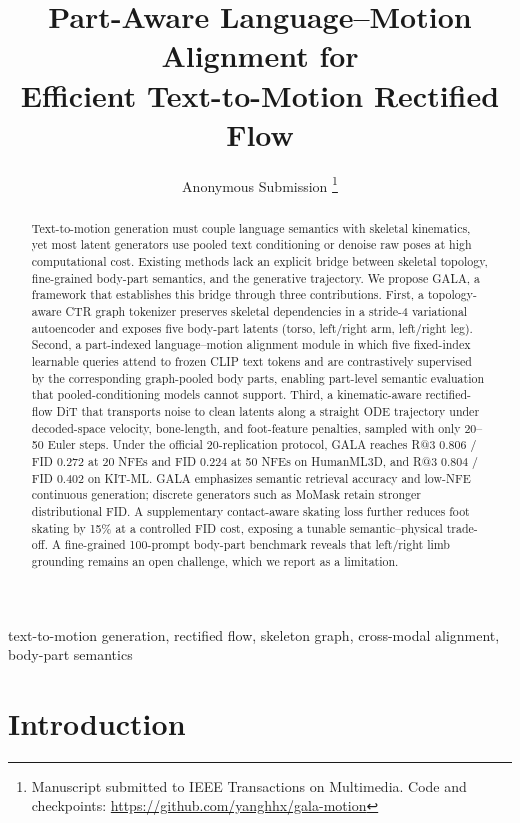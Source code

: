 \documentclass[journal]{IEEEtran}
\title{Part-Aware Language--Motion Alignment for\\Efficient Text-to-Motion Rectified Flow}
\author{Anonymous Submission%
\thanks{Manuscript submitted to IEEE Transactions on Multimedia. Code and checkpoints: \url{https://github.com/yanghhx/gala-motion}}}
\begin{document}
\maketitle

\begin{abstract}
Text-to-motion generation must couple language semantics with skeletal kinematics, yet most latent generators use pooled text conditioning or denoise raw poses at high computational cost. Existing methods lack an explicit bridge between skeletal topology, fine-grained body-part semantics, and the generative trajectory. We propose GALA, a framework that establishes this bridge through three contributions. First, a topology-aware CTR graph tokenizer preserves skeletal dependencies in a stride-4 variational autoencoder and exposes five body-part latents (torso, left/right arm, left/right leg). Second, a part-indexed language--motion alignment module in which five fixed-index learnable queries attend to frozen CLIP text tokens and are contrastively supervised by the corresponding graph-pooled body parts, enabling part-level semantic evaluation that pooled-conditioning models cannot support. Third, a kinematic-aware rectified-flow DiT that transports noise to clean latents along a straight ODE trajectory under decoded-space velocity, bone-length, and foot-feature penalties, sampled with only 20--50 Euler steps. Under the official 20-replication protocol, GALA reaches R@3 $0.806$ / FID $0.272$ at 20 NFEs and FID $0.224$ at 50 NFEs on HumanML3D, and R@3 $0.804$ / FID $0.402$ on KIT-ML. GALA emphasizes semantic retrieval accuracy and low-NFE continuous generation; discrete generators such as MoMask retain stronger distributional FID. A supplementary contact-aware skating loss further reduces foot skating by 15\% at a controlled FID cost, exposing a tunable semantic--physical trade-off. A fine-grained 100-prompt body-part benchmark reveals that left/right limb grounding remains an open challenge, which we report as a limitation.
\end{abstract}

\begin{IEEEkeywords}
text-to-motion generation, rectified flow, skeleton graph, cross-modal alignment, body-part semantics
\end{IEEEkeywords}

\IEEEpeerreviewmaketitle

\section{Introduction}
\end{document}
